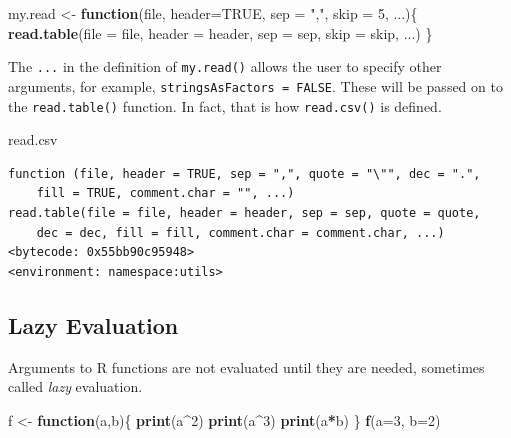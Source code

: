 \documentclass[
]{krantz}
\makeatletter
\newenvironment{Shaded}{\begin{snugshade}}{\end{snugshade}}
\newcommand{\ControlFlowTok}[1]{\textcolor[rgb]{0.27,0.27,0.27}{\textbf{#1}}}
\newcommand{\DataTypeTok}[1]{\textcolor[rgb]{0.27,0.27,0.27}{#1}}
\newcommand{\DecValTok}[1]{\textcolor[rgb]{0.06,0.06,0.06}{#1}}
\newcommand{\KeywordTok}[1]{\textcolor[rgb]{0.27,0.27,0.27}{\textbf{#1}}}
\newcommand{\NormalTok}[1]{#1}
\newcommand{\OperatorTok}[1]{\textcolor[rgb]{0.43,0.43,0.43}{\textbf{#1}}}
\newcommand{\OtherTok}[1]{\textcolor[rgb]{0.37,0.37,0.37}{#1}}
\newcommand{\StringTok}[1]{\textcolor[rgb]{0.5,0.5,0.5}{#1}}
\newenvironment{kframe}{%
\medskip{}
\setlength{\fboxsep}{.8em}
 \def\at@end@of@kframe{}%
 \ifinner\ifhmode%
  \def\at@end@of@kframe{\end{minipage}}%
  \begin{minipage}{\columnwidth}%
 \fi\fi%
 \def\FrameCommand##1{\hskip\@totalleftmargin \hskip-\fboxsep
 \colorbox{shadecolor}{##1}\hskip-\fboxsep
     \hskip-\linewidth \hskip-\@totalleftmargin \hskip\columnwidth}%
 \MakeFramed {\advance\hsize-\width
   \@totalleftmargin\z@ \linewidth\hsize
   \@setminipage}}%
 {\par\unskip\endMakeFramed%
 \at@end@of@kframe}
\renewenvironment{Shaded}{\begin{kframe}}{\end{kframe}}
\makeatother
\begin{document}
\begin{Shaded}
\begin{Highlighting}[]
\NormalTok{my.read \textless{}{-}}\StringTok{ }\ControlFlowTok{function}\NormalTok{(file, }\DataTypeTok{header=}\OtherTok{TRUE}\NormalTok{, }\DataTypeTok{sep =} \StringTok{","}\NormalTok{, }\DataTypeTok{skip =} \DecValTok{5}\NormalTok{, ...)\{}
    \KeywordTok{read.table}\NormalTok{(}\DataTypeTok{file =}\NormalTok{ file, }\DataTypeTok{header =}\NormalTok{ header, }\DataTypeTok{sep =}\NormalTok{ sep, }\DataTypeTok{skip =}\NormalTok{ skip, ...)}
\NormalTok{\}}
\end{Highlighting}
\end{Shaded}

The \texttt{...} in the definition of \texttt{my.read()} allows the user to specify other arguments, for example, \texttt{stringsAsFactors\ =\ FALSE}. These will be passed on to the \texttt{read.table()} function. In fact, that is how \texttt{read.csv()} is defined.

\begin{Shaded}
\begin{Highlighting}[]
\NormalTok{read.csv}
\end{Highlighting}
\end{Shaded}

\begin{verbatim}
function (file, header = TRUE, sep = ",", quote = "\"", dec = ".", 
    fill = TRUE, comment.char = "", ...) 
read.table(file = file, header = header, sep = sep, quote = quote, 
    dec = dec, fill = fill, comment.char = comment.char, ...)
<bytecode: 0x55bb90c95948>
<environment: namespace:utils>
\end{verbatim}

\hypertarget{lazy-evaluation}{%
\subsection{Lazy Evaluation}\label{lazy-evaluation}}

Arguments to R functions are not evaluated until they are needed, sometimes called \emph{lazy} evaluation.

\begin{Shaded}
\begin{Highlighting}[]
\NormalTok{f \textless{}{-}}\StringTok{ }\ControlFlowTok{function}\NormalTok{(a,b)\{}
    \KeywordTok{print}\NormalTok{(a}\OperatorTok{\^{}}\DecValTok{2}\NormalTok{)}
    \KeywordTok{print}\NormalTok{(a}\OperatorTok{\^{}}\DecValTok{3}\NormalTok{)}
    \KeywordTok{print}\NormalTok{(a}\OperatorTok{*}\NormalTok{b)}
\NormalTok{\}}
\KeywordTok{f}\NormalTok{(}\DataTypeTok{a=}\DecValTok{3}\NormalTok{, }\DataTypeTok{b=}\DecValTok{2}\NormalTok{)}
\end{Highlighting}
\end{Shaded}
\end{document}
